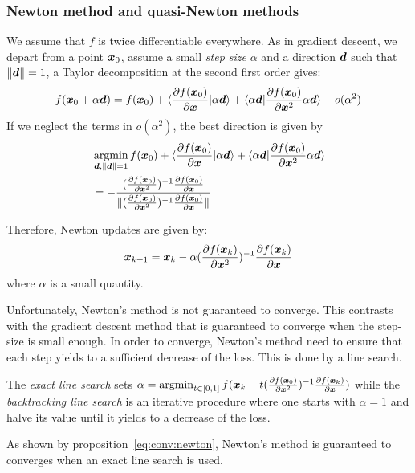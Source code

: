 \subsubsection{Newton method and quasi-Newton methods}
\label{sec:qn}
We assume that $f$ is twice differentiable everywhere.
As in gradient descent, we depart from a point $\xb_0$, assume a small \emph{step size} $\alpha$ and a direction
$\db$ such that $\|\db\| = 1$, a Taylor decomposition at the second first order gives:
\begin{align}
  f(\xb_0 + \alpha \db) = f(\xb_0) + \langle \partialfrac{\xb}{f(\xb_0)} | \alpha \db \rangle + \langle \alpha \db | \partialfrac{\xb^2}{f(\xb_0)} \alpha \db \rangle + o(\alpha^2) 
\end{align}
If we neglect the terms in $o(\alpha^2)$, the best direction is given by
\begin{align}
  &\argmin_{\db, \|\db\| = 1} f(\xb_0) + \langle \partialfrac{\xb}{f(\xb_0)} | \alpha \db \rangle + \langle \alpha \db | \partialfrac{\xb^2}{f(\xb_0)} \alpha \db \rangle \\
  &= - \frac{(\partialfrac{\xb^2}{f(\xb_0)})^{-1}\partialfrac{\xb}{f(\xb_0)}}{\| (\partialfrac{\xb^2}{f(\xb_0)})^{-1} \partialfrac{\xb}{f(\xb_0)}\|}
\end{align}


Therefore, Newton updates are given by:
\begin{align}
  \xb_{k+1} = \xb_k -\alpha (\partialfrac{\xb^2}{f(\xb_k)})^{-1} \partialfrac{\xb}{f(\xb_k)} \label{eq:update:newton}
\end{align}
where $\alpha$ is a small quantity.

Unfortunately, Newton's method is not guaranteed to converge. This contrasts with the gradient descent method that is guaranteed to converge when the step-size is small enough.
In order to converge, Newton's method need to ensure that each step yields to a sufficient decrease of the loss. This is done by a line search.

The \emph{exact line search} sets $\alpha = \argmin_{t \in [0, 1]} f(\xb_k - t
(\partialfrac{\xb^2}{f(\xb_0)})^{-1} \partialfrac{\xb}{f(\xb_k)})$ while the \emph{backtracking line search} is an iterative procedure where one starts with $\alpha=1$ and halve its value until it yields to a decrease of the loss.

As shown by proposition~\ref{eq:conv:newton}, Newton's method is guaranteed to converges when an
exact line search is used.

